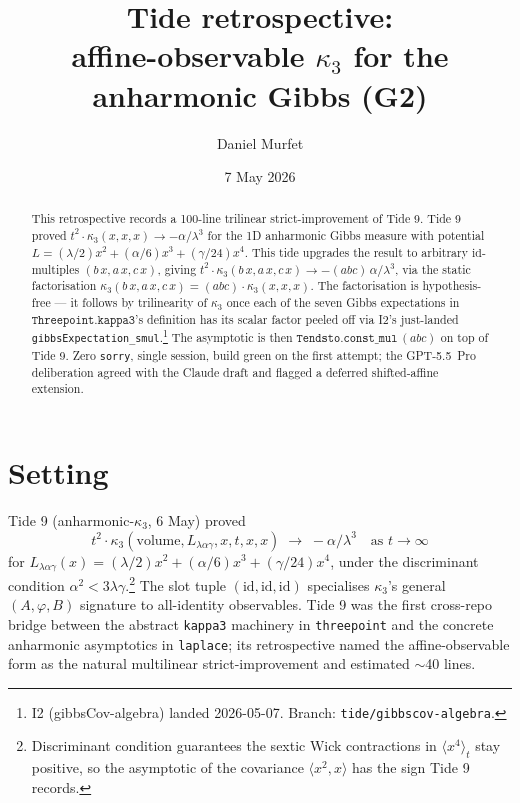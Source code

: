 \documentclass[11pt]{article}
\title{Tide retrospective:\\affine-observable $\kappa_3$ for the anharmonic Gibbs (G2)}
\author{Daniel Murfet}
\date{7 May 2026}
\begin{document}
\maketitle

\begin{abstract}
This retrospective records a 100-line trilinear strict-improvement of
Tide 9. Tide 9 proved
$t^2 \cdot \kappa_3(x, x, x) \to -\alpha/\lambda^3$ for the 1D anharmonic
Gibbs measure with potential $L = (\lambda/2)x^2 + (\alpha/6)x^3 + (\gamma/24)x^4$.
This tide upgrades the result to arbitrary $\mathrm{id}$-multiples
$(b\,x, a\,x, c\,x)$, giving
$t^2 \cdot \kappa_3(b\,x, a\,x, c\,x) \to -(abc)\,\alpha/\lambda^3$,
via the static factorisation
$\kappa_3(b\,x, a\,x, c\,x) = (abc)\cdot\kappa_3(x, x, x)$.
The factorisation is hypothesis-free — it follows by trilinearity of
$\kappa_3$ once each of the seven Gibbs expectations in
$\mathtt{Threepoint.kappa3}$'s definition has its scalar factor peeled
off via I2's just-landed
\texttt{gibbsExpectation\_smul}.\footnote{I2 (gibbsCov-algebra) landed
2026-05-07. Branch: \texttt{tide/gibbscov-algebra}.}
The asymptotic is then $\mathtt{Tendsto.const\_mul}\,(abc)$ on top of
Tide 9. Zero \texttt{sorry}, single session, build green on the first
attempt; the GPT-5.5~Pro deliberation agreed with the Claude draft and
flagged a deferred shifted-affine extension.
\end{abstract}

\section{Setting}

Tide 9 (anharmonic-$\kappa_3$, 6 May) proved
\[
  t^2 \cdot \kappa_3(\mathrm{volume}, L_{\lambda\alpha\gamma}, x, t, x, x)
  \;\to\; -\alpha/\lambda^3
  \quad\text{as } t \to \infty
\]
for $L_{\lambda\alpha\gamma}(x) = (\lambda/2)x^2 + (\alpha/6)x^3 + (\gamma/24)x^4$,
under the discriminant condition $\alpha^2 < 3\lambda\gamma$.\footnote{Discriminant
condition guarantees the sextic Wick contractions in $\langle x^4\rangle_t$ stay
positive, so the asymptotic of the covariance $\langle x^2, x\rangle$ has the
sign Tide 9 records.} The slot tuple $(\mathrm{id}, \mathrm{id}, \mathrm{id})$
specialises $\kappa_3$'s general $(A, \varphi, B)$ signature to all-identity
observables. Tide 9 was the first cross-repo bridge between the abstract
\texttt{kappa3} machinery in \texttt{threepoint} and the concrete anharmonic
asymptotics in \texttt{laplace}; its retrospective named the affine-observable
form as the natural multilinear strict-improvement and estimated $\sim$40
lines.
\end{document}

